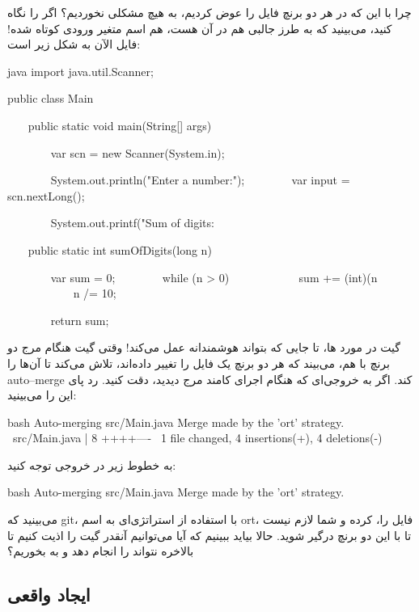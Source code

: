 چرا با این که در هر دو برنچ‌ فایل  را عوض کردیم،
به هیچ مشکلی نخوردیم؟ اگر  را نگاه کنید، می‌بینید که به
طرز جالبی هم  در آن هست، هم اسم متغیر
ورودی  کوتاه شده! فایل 
الآن به شکل زیر است:

\begin{codebox}{java}
import java.util.Scanner;

public class Main {
    public static void main(String[] args) {
        var scn = new Scanner(System.in);  
  
        System.out.println("Enter a number:");
        var input = scn.nextLong();  
  
        System.out.printf("Sum of digits: %
    }

    public static int sumOfDigits(long n) {
        var sum = 0;
        while (n > 0) {  
            sum += (int)(n %
            n /= 10;  
        }

        return sum;  
    }  
}
\end{codebox}

گیت در مورد  ها، تا جایی که بتواند هوشمندانه عمل می‌کند! وقتی
گیت هنگام مرج دو برنچ با هم، می‌بیند که هر دو برنچ یک فایل را تغییر
داده‌اند، تلاش می‌کند تا آن‌ها را auto--merge کند. اگر به خروجی‌ای که هنگام
اجرای کامند مرج  دیدید، دقت کنید. رد پای
این  را می‌بینید:

\begin{codebox}{bash}
Auto-merging src/Main.java  
Merge made by the 'ort' strategy.  
 src/Main.java | 8 ++++----  
 1 file changed, 4 insertions(+), 4 deletions(-)
\end{codebox}

به خطوط زیر در خروجی توجه کنید:

\begin{codebox}{bash}
Auto-merging src/Main.java  
Merge made by the 'ort' strategy.
\end{codebox}

می‌بینید که git، با استفاده از استراتژی‌ای به اسم ort، فایل
 را،  کرده و شما لازم نیست تا
با  این دو برنچ درگیر شوید. حالا بیاید ببینیم که آیا می‌توانیم
آنقدر گیت را اذیت کنیم تا بالاخره نتواند  را انجام دهد و به
 بخوریم؟

\subsection{ایجاد  واقعی}

